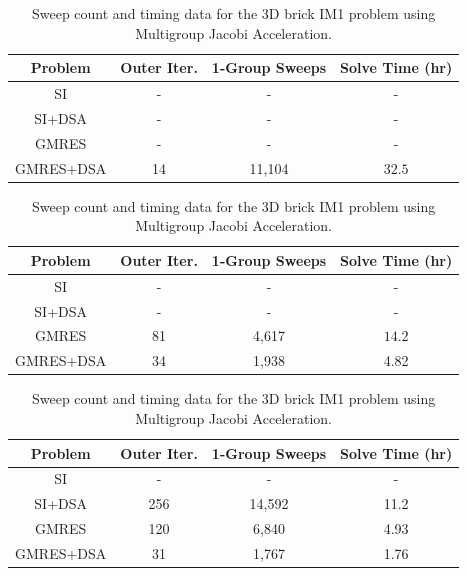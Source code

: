 \begin{table}
\caption{Sweep count and timing data for the 3D brick IM1 problem using Two-Grid Acceleration.}
\centering
\def\arraystretch{1.25}
\begin{tabular}{|c|c|c|c|}
\hline
Problem & Outer Iter.  & 1-Group Sweeps & Solve Time (hr)  \\
\hline \hline
SI & - & -  & -  \\ \hline
SI+DSA & -  & - & -  \\ \hline
GMRES & -  & - & - \\ \hline
{GMRES+DSA} & {14} &  {11,104}  &  {$32.5$}  \\ \hline
\end{tabular}
\label{tab::IM1_3Dbrick_TG}
\vspace{1.5cm}
\caption{Sweep count and timing data for the 3D brick IM1 problem using Modified Two-Grid Acceleration.}
\centering
\def\arraystretch{1.25}
\begin{tabular}{|c|c|c|c|}
\hline
Problem & Outer Iter.  & 1-Group Sweeps & Solve Time (hr)  \\
\hline \hline
SI & - &  - & -  \\ \hline
SI+DSA & -  & - & -  \\ \hline
{GMRES} & {81}  & {4,617 }& {$14.2$} \\ \hline
GMRES+DSA & 34 &  1,938  &  4.82  \\ \hline
\end{tabular}
\label{tab::IM1_3Dbrick_MTG}
\vspace{1.5cm}
\caption{Sweep count and timing data for the 3D brick IM1 problem using Multigroup Jacobi Acceleration.}
\centering
\def\arraystretch{1.25}
\begin{tabular}{|c|c|c|c|}
\hline
Problem & Outer Iter.  & 1-Group Sweeps & Solve Time (hr)  \\
\hline \hline
SI &  - & - & -  \\ \hline
SI+DSA & 256 &  14,592 & 11.2 \\ \hline
{GMRES} & {120} & {6,840} & {4.93} \\ \hline
{GMRES+DSA} & {31}& {1,767} & {1.76} \\ \hline
\end{tabular}
\label{tab::IM1_3Dbrick_MJA}
\end{table}

